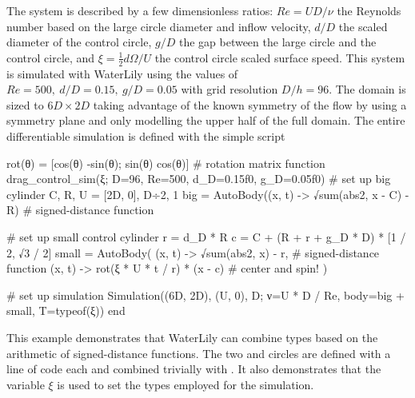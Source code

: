 \documentclass[10pt,a4paper]{article}
\begin{document}
The system is described by a few dimensionless ratios: $Re=UD/\nu$ the Reynolds number based on the large circle diameter and inflow velocity, $d/D$ the scaled diameter of the control circle, $g/D$ the gap between the large circle and the control circle, and $\xi=\frac 12 d\Omega/U$ the control circle scaled surface speed. This system is simulated with WaterLily using the values of $Re=500,\ d/D=0.15,\ g/D=0.05$ with grid resolution $D/h=96$. The domain is sized to $6D\times2D$ taking advantage of the known symmetry of the flow by using a symmetry plane and only modelling the upper half of the full domain. The entire differentiable simulation is defined with the simple script

\begin{minipage}{\linewidth}\noindent
\begin{jllisting}
rot(θ) = [cos(θ) -sin(θ); sin(θ) cos(θ)] # rotation matrix
function drag_control_sim(ξ; D=96, Re=500, d_D=0.15f0, g_D=0.05f0)
    # set up big cylinder
    C, R, U = [2D, 0], D÷2, 1
    big = AutoBody((x, t) -> √sum(abs2, x - C) - R) # signed-distance function

    # set up small control cylinder
    r = d_D * R
    c = C + (R + r + g_D * D) * [1 / 2, √3 / 2]
    small = AutoBody(
        (x, t) -> √sum(abs2, x) - r,           # signed-distance function
        (x, t) -> rot(ξ * U * t / r) * (x - c) # center and spin!
    )

    # set up simulation
    Simulation((6D, 2D), (U, 0), D; ν=U * D / Re, body=big + small, T=typeof(ξ))
end
\end{jllisting}
\end{minipage}

This example demonstrates that WaterLily can combine  types based on the arithmetic of signed-distance functions. The two  and  circles are defined with a line of code each and combined trivially with . It also demonstrates that the variable $\xi$ is used to set the types employed for the simulation. 
\end{document}
